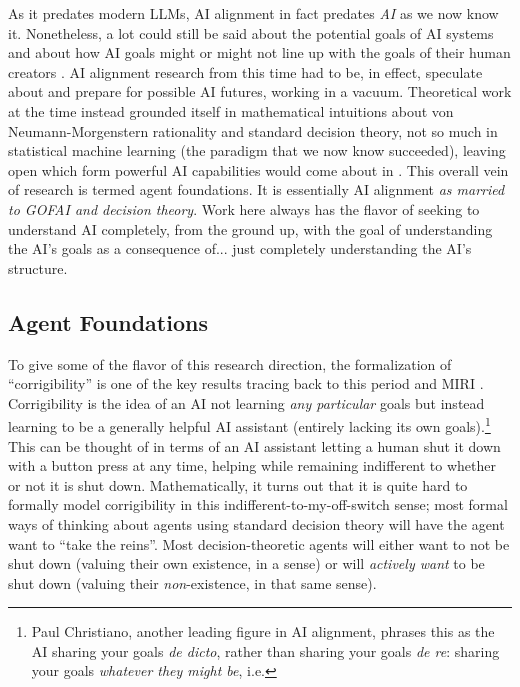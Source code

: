 As it predates modern LLMs, AI alignment in fact predates \emph{AI} as we now
know it. Nonetheless, a lot could still be said about the potential goals of AI
systems and about how AI goals might or might not line up with the goals of
their human creators
\cite{bostrom2014superintelligence,omohundro2008drives,yudkowsky2008factor}. AI
alignment research from this time had to be, in effect, speculate about and
prepare for possible AI futures, working in a vacuum. Theoretical work at the
time instead grounded itself in mathematical intuitions about von
Neumann-Morgenstern rationality \cite{von1944games} and standard decision
theory, not so much in statistical machine learning (the paradigm that we now
know succeeded), leaving open which form powerful AI capabilities would come
about in \cite{soares2015corrigibility}. This overall vein of research is
termed agent foundations. It is essentially AI alignment \emph{as married to
GOFAI and decision theory}. Work here always has the flavor of seeking to
understand AI completely, from the ground up, with the goal of understanding
the AI's goals as a consequence of... just completely understanding the AI's
structure.

\subsection{Agent Foundations}
To give some of the flavor of this research direction, the formalization of
``corrigibility'' is one of the key results tracing back to this period and
MIRI \cite{soares2015corrigibility}. Corrigibility is the idea of an AI not
learning \emph{any particular} goals but instead learning to be a generally
helpful AI assistant (entirely lacking its own goals).\footnote{Paul
Christiano, another leading figure in AI alignment, phrases this as the AI
sharing your goals \emph{de dicto}, rather than sharing your goals \emph{de
re}: sharing your goals \emph{whatever they might be}, i.e.} This can be
thought of in terms of an AI assistant letting a human shut it down with a
button press at any time, helping while remaining indifferent to whether or not
it is shut down. Mathematically, it turns out that it is quite hard to formally
model corrigibility in this indifferent-to-my-off-switch sense; most formal
ways of thinking about agents using standard decision theory will have the
agent want to ``take the reins''. Most decision-theoretic agents will either
want to not be shut down (valuing their own existence, in a sense) or will
\emph{actively want} to be shut down (valuing their \emph{non}-existence, in
that same sense).

